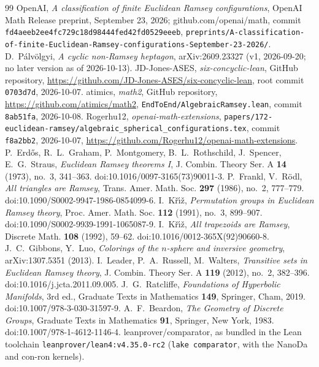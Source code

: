 \documentclass[11pt]{amsart}
\newcommand{\Kriz}{K\v{r}\'{\i}\v{z}}
\theoremstyle{plain}
\theoremstyle{definition}
\begin{document}
\begin{thebibliography}{99}
 OpenAI, \emph{A classification of finite Euclidean Ramsey configurations},
OpenAI Math Release preprint, September 23, 2026; github.com/openai/math, commit
\texttt{fd4aeeb2ee4fc729c18d98444fed42fd0529eeeb}, \texttt{preprints/A-classification-of-finite-Euclidean-Ramsey-configurations-September-23-2026/}.
 D.~P\'alv\"olgyi, \emph{A cyclic non-Ramsey heptagon}, arXiv:2609.23327 (v1,
2026-09-20; no later version as of 2026-10-13).
 JD-Jones-ASES, \emph{six-concyclic-lean}, GitHub repository,
\url{https://github.com/JD-Jones-ASES/six-concyclic-lean}, root commit \texttt{0703d7d}, 2026-10-07.
 atimics, \emph{math2}, GitHub repository, \url{https://github.com/atimics/math2},
\texttt{EndToEnd/AlgebraicRamsey.lean}, commit \texttt{8ab51fa}, 2026-10-08.
 Rogerhu12, \emph{openai-math-extensions},
\texttt{papers/172-euclidean-ramsey/algebraic\_spherical\_configurations.tex}, commit
\texttt{f8a2bb2}, 2026-10-07, \url{https://github.com/Rogerhu12/openai-math-extensions}.
 P.~Erd\H{o}s, R.~L.~Graham, P.~Montgomery, B.~L.~Rothschild, J.~Spencer,
E.~G.~Straus, \emph{Euclidean Ramsey theorems I}, J. Combin. Theory Ser. A \textbf{14} (1973),
no.~3, 341--363. doi:10.1016/0097-3165(73)90011-3.
 P.~Frankl, V.~R\"odl, \emph{All triangles are Ramsey}, Trans. Amer. Math. Soc.
\textbf{297} (1986), no.~2, 777--779. doi:10.1090/S0002-9947-1986-0854099-6.
 I.~\Kriz, \emph{Permutation groups in Euclidean Ramsey theory}, Proc. Amer.
Math. Soc. \textbf{112} (1991), no.~3, 899--907. doi:10.1090/S0002-9939-1991-1065087-9.
 I.~\Kriz, \emph{All trapezoids are Ramsey}, Discrete Math. \textbf{108} (1992),
59--62. doi:10.1016/0012-365X(92)90660-8.
 J.~C.~Gibbons, Y.~Luo, \emph{Colorings of the $n$-sphere and inversive geometry},
arXiv:1307.5351 (2013).
 I.~Leader, P.~A.~Russell, M.~Walters, \emph{Transitive sets in Euclidean Ramsey
theory}, J. Combin. Theory Ser. A \textbf{119} (2012), no.~2, 382--396.
doi:10.1016/j.jcta.2011.09.005.
 J.~G.~Ratcliffe, \emph{Foundations of Hyperbolic Manifolds}, 3rd ed.,
Graduate Texts in Mathematics \textbf{149}, Springer, Cham, 2019. doi:10.1007/978-3-030-31597-9.
 A.~F.~Beardon, \emph{The Geometry of Discrete Groups}, Graduate Texts in
Mathematics \textbf{91}, Springer, New York, 1983. doi:10.1007/978-1-4612-1146-4.
 leanprover/comparator, as bundled in the Lean toolchain
\texttt{leanprover/lean4:v4.35.0-rc2} (\texttt{lake comparator}, with the NanoDa and con-ron
kernels).
\end{thebibliography}
\end{document}
